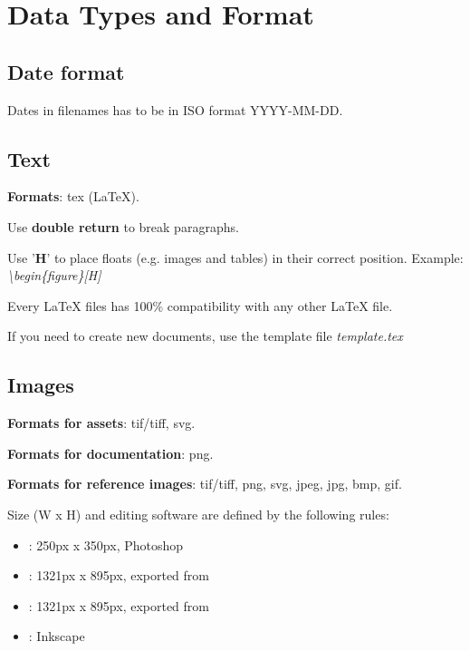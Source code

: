 \section{Data Types and Format}

\subsection{Date format}
Dates in filenames has to be in ISO format YYYY-MM-DD.

\subsection{Text}
\textbf{Formats}: tex (LaTeX).


Use \textbf{double return} to break paragraphs.

Use '\textbf{H}' to place floats (e.g. images and tables) in their correct position. Example: \textit{\textbackslash{}begin\{figure\}[H]}

Every LaTeX files has 100\% compatibility with any other LaTeX file.

If you need to create new documents, use the template file \textit{template.tex}

\subsection{Images}
\textbf{Formats for assets}: tif/tiff, svg.

\textbf{Formats for documentation}: png.

\textbf{Formats for reference images}: tif/tiff, png, svg, jpeg, jpg, bmp, gif.

Size (W x H) and editing software are defined by the following rules:
\begin{itemize}
	\item \textbf{}: 250px x 350px, Photoshop
	\item \textbf{}: 1321px x 895px, exported from 
	\item \textbf{}: 1321px x 895px, exported from 
	\item \textbf{}: Inkscape
\end{itemize}

